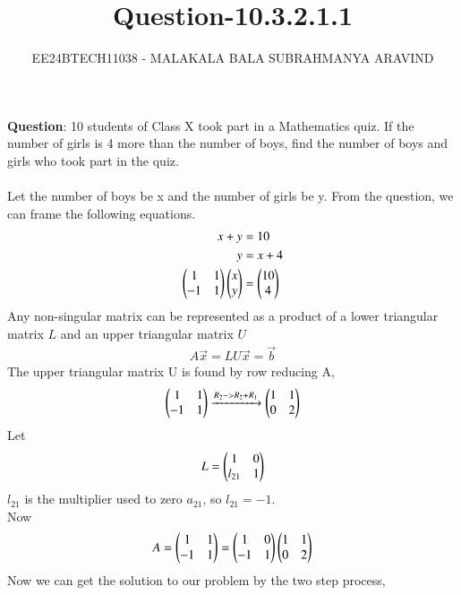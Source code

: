 \documentclass[journal]{IEEEtran}
\numberwithin{equation}{enumi}
\numberwithin{figure}{enumi}
\begin{document}

\title{Question-10.3.2.1.1}
\author{EE24BTECH11038 - MALAKALA BALA SUBRAHMANYA ARAVIND}
{\let\newpage\relax\maketitle}
\textbf{Question}: 10 students of Class X took part in a Mathematics quiz. If the number of girls is 4
more than the number of boys, find the number of boys and girls who took part in
the quiz. \\
\solution \\
Let the number of boys be x and the number of girls be y. From the question, we can frame the following equations.\\
\begin{align}
    x+y&=10\\
    y&=x+4\\
    \begin{pmatrix}1&1\\-1&1\end{pmatrix}\begin{pmatrix}x\\y\end{pmatrix}&=\begin{pmatrix}10\\4\end{pmatrix}\\
\end{align}
Any non-singular matrix can be represented as a product of a lower triangular matrix $L$ and an
upper triangular matrix $U$
\begin{align}
    A\vec{x} = LU\vec{x} = \vec{b}
\end{align}
The upper triangular matrix U is found by row reducing A,
\begin{align}
    \begin{pmatrix}1&1\\-1&1\end{pmatrix} \xrightarrow{R_2 -> R_2+R_1} \begin{pmatrix}1&1\\0&2\end{pmatrix}
\end{align}
Let 
\begin{align}
    L = \begin{pmatrix}1 & 0\\ l_{21} & 1\end{pmatrix}
\end{align}
$l_{21}$ is the multiplier used to zero $a_{21}$, so $l_{21} = -1$.\\
Now
\begin{align}
   A=\begin{pmatrix}1&1\\-1&1\end{pmatrix}=\begin{pmatrix}1&0\\-1&1\end{pmatrix}\begin{pmatrix}1&1\\0&2\end{pmatrix}
\end{align}
Now we can get the solution to our problem by the two step process,
\end{document}
